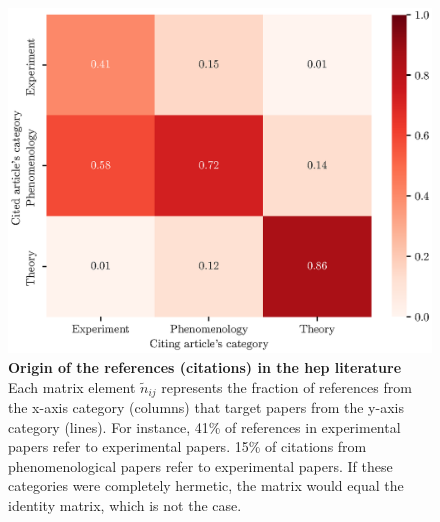 \documentclass[smallextended]{svjour3}
\begin{document}
\begin{figure}
    \centering
    \includegraphics{Fig8.eps}
    \caption{\textbf{Origin of the references (citations) in the \gls{hep} literature}
    Each matrix element $\tilde{n}_{ij}$ represents the fraction of references from the x-axis category (columns) that target papers from the y-axis category (lines). For instance, 41\% of references in experimental papers refer to experimental papers. 15\% of citations from phenomenological papers refer to experimental papers. If these categories were completely hermetic, the matrix would equal the identity matrix, which is not the case.}
    \label{fig:cites_matrix}
\end{figure}

\end{document}
